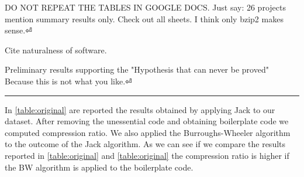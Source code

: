 DO NOT REPEAT THE TABLES IN GOOGLE DOCS.
Just say: 26 projects mention summary results only.
Check out all sheets. I think only bzip2 makes sense.⏎

Cite naturalness of software.

Preliminary results supporting the
"Hypothesis that can never be proved"
Because this is not what you like.⏎

\hrule

In \cref{table:original} are reported the results obtained by applying Jack to
our dataset. After removing the unessential code and obtaining boilerplate
code we computed compression ratio. We also applied the Burroughs-Wheeler
algorithm to the outcome of the Jack algorithm. As we can see if we compare
the results reported in \cref{table:original} and \cref{table:original} the
compression ratio is higher if the BW algorithm is applied to the boilerplate
code.

\begin{table}
  \label{table:original}
  \caption{The results of the compression using the Jack algorithm alone and both Jack and
  Burroughs-Wheeler algorithms combined}
  \centering
\end{table}

